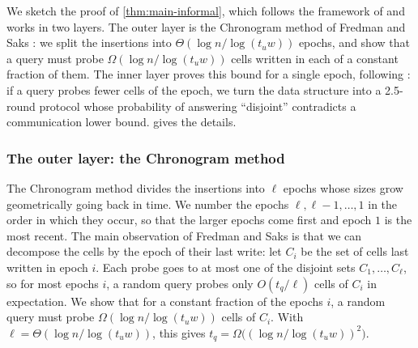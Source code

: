 \documentclass[11pt]{article}
\theoremstyle{plain}
\theoremstyle{definition}
\theoremstyle{remark}
\begin{document}
We sketch the proof of \cref{thm:main-informal}, which follows the framework of \cite{ko_omega_2026} and works in two layers. The outer layer is the Chronogram method of Fredman and Saks \cite{fredman_cell_1989}: we split the insertions into $\Theta(\log n/\log(t_u w))$ epochs, and show that a query must probe $\Omega(\log n/\log(t_u w))$ cells written in each of a constant fraction of them. The inner layer proves this bound for a single epoch, following \cite{ko_omega_2026}: if a query probes fewer cells of the epoch, we turn the data structure into a 2.5-round protocol whose probability of answering ``disjoint'' contradicts a communication lower bound.  gives the details.

\subsubsection{The outer layer: the Chronogram method}

The Chronogram method \cite{fredman_cell_1989} divides the insertions into $\ell$ epochs whose sizes grow geometrically going back in time. We number the epochs $\ell, \ell-1, \dots, 1$ in the order in which they occur, so that the larger epochs come first and epoch $1$ is the most recent. The main observation of Fredman and Saks is that we can decompose the cells by the epoch of their last write: let $C_i$ be the set of cells last written in epoch $i$. Each probe goes to at most one of the disjoint sets $C_1, \dots, C_\ell$, so for most epochs $i$, a random query probes only $O(t_q/\ell)$ cells of $C_i$ in expectation. We show that for a constant fraction of the epochs $i$, a random query must probe $\Omega(\log n/\log(t_u w))$ cells of $C_i$. With $\ell = \Theta(\log n/\log(t_u w))$, this gives $t_q = \Omega\big((\log n/\log(t_u w))^2\big)$.
\end{document}
